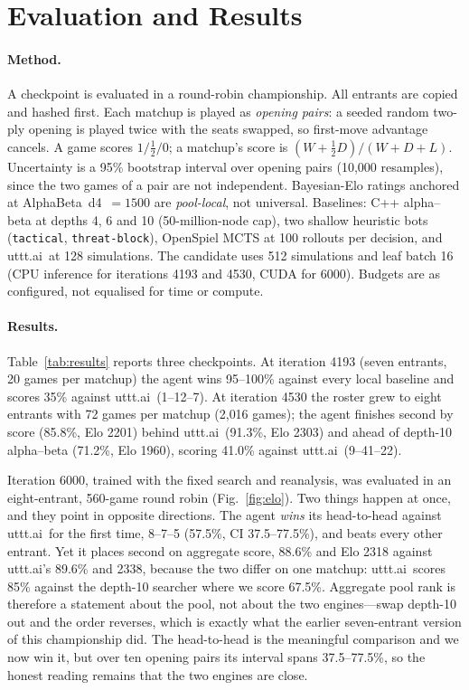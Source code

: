 \documentclass[conference]{IEEEtran}
\newcommand{\code}[1]{\texttt{#1}}
\newcommand{\utttai}{uttt.ai}
\begin{document}
\section{Evaluation and Results}
\label{sec:results}

\paragraph{Method.}
A checkpoint is evaluated in a round-robin championship. All entrants are
copied and hashed first. Each matchup is played as \emph{opening pairs}: a
seeded random two-ply opening is played twice with the seats swapped, so
first-move advantage cancels. A game scores $1/\tfrac12/0$; a matchup's
score is $(W+\tfrac12D)/(W+D+L)$. Uncertainty is a 95\% bootstrap interval
over opening pairs (10{,}000 resamples), since the two games of a pair are
not independent. Bayesian-Elo ratings anchored at AlphaBeta~d4~$=1500$ are
\emph{pool-local}, not universal. Baselines: C++ alpha--beta at depths 4,
6 and 10 (50-million-node cap), two shallow heuristic bots
(\code{tactical}, \code{threat-block}), OpenSpiel MCTS at 100 rollouts per
decision, and \utttai\ at 128 simulations. The candidate uses 512
simulations and leaf batch 16 (CPU inference for iterations 4193 and 4530,
CUDA for 6000). Budgets are as configured, not equalised for time or
compute.

\paragraph{Results.}
Table~\ref{tab:results} reports three checkpoints. At iteration 4193 (seven
entrants, 20 games per matchup) the agent wins 95--100\% against every
local baseline and scores 35\% against \utttai\ (1--12--7). At iteration
4530 the roster grew to eight entrants with 72 games per matchup (2{,}016
games); the agent finishes second by score (85.8\%, Elo 2201) behind
\utttai\ (91.3\%, Elo 2303) and ahead of depth-10 alpha--beta (71.2\%,
Elo 1960), scoring 41.0\% against \utttai\ (9--41--22).

Iteration 6000, trained with the fixed search and reanalysis, was evaluated
in an eight-entrant, 560-game round robin (Fig.~\ref{fig:elo}). Two
things happen at once, and they point in opposite directions. The agent
\emph{wins} its head-to-head against \utttai\ for the first time, 8--7--5
(57.5\%, CI 37.5--77.5\%), and beats every other entrant. Yet it places
second on aggregate score, 88.6\% and Elo 2318 against \utttai's 89.6\% and
2338, because the two differ on one matchup: \utttai\ scores 85\% against
the depth-10 searcher where we score 67.5\%. Aggregate pool rank is
therefore a statement about the pool, not about the two engines---swap
depth-10 out and the order reverses, which is exactly what the earlier
seven-entrant version of this championship did. The head-to-head is the
meaningful comparison and we now win it, but over ten opening pairs its
interval spans 37.5--77.5\%, so the honest reading remains that the two
engines are close.
\end{document}
